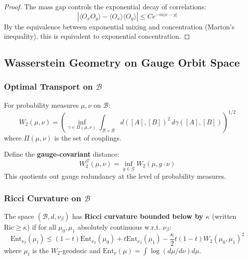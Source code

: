 \begin{proof}
The mass gap controls the exponential decay of correlations:
\[
|\langle O_x O_y \rangle - \langle O_x \rangle \langle O_y \rangle| \leq C e^{-m|x-y|}
\]
By the equivalence between exponential mixing and concentration (Marton's inequality), this is equivalent to exponential concentration.
\end{proof}

\subsection{Wasserstein Geometry on Gauge Orbit Space}

\subsubsection{Optimal Transport on $\mathcal{B}$}

\begin{definition}
For probability measures $\mu, \nu$ on $\mathcal{B}$:
\[
W_2(\mu, \nu) = \left(\inf_{\gamma \in \Pi(\mu,\nu)} \int_{\mathcal{B} \times \mathcal{B}} d([A], [B])^2 \, d\gamma([A], [B])\right)^{1/2}
\]
where $\Pi(\mu, \nu)$ is the set of couplings.
\end{definition}

\begin{definition}
Define the \textbf{gauge-covariant} distance:
\[
W_2^{\mathcal{G}}(\mu, \nu) = \inf_{g \in \mathcal{G}} W_2(\mu, g \cdot \nu)
\]
This quotients out gauge redundancy at the level of probability measures.
\end{definition}

\subsubsection{Ricci Curvature on $\mathcal{B}$}

\begin{definition}
The space $(\mathcal{B}, d, \nu_\beta)$ has \textbf{Ricci curvature bounded below by $\kappa$} (written $\text{Ric} \geq \kappa$) if for all $\mu_0, \mu_1$ absolutely continuous w.r.t. $\nu_\beta$:
\[
\text{Ent}_{\nu_\beta}(\mu_t) \leq (1-t) \text{Ent}_{\nu_\beta}(\mu_0) + t \text{Ent}_{\nu_\beta}(\mu_1) - \frac{\kappa}{2} t(1-t) W_2(\mu_0, \mu_1)^2
\]
where $\mu_t$ is the $W_2$-geodesic and $\text{Ent}_{\nu}(\mu) = \int \log(d\mu/d\nu) d\mu$.
\end{definition}

